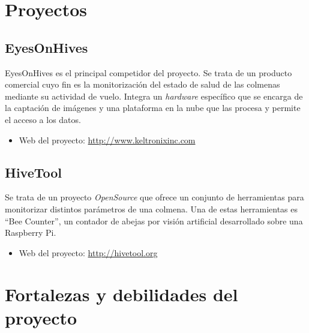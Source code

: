 \section{Proyectos}\label{proyectos}

\subsection{EyesOnHives}\label{eyesonhives}

EyesOnHives es el principal competidor del proyecto. Se trata de un
producto comercial cuyo fin es la monitorización del estado de salud de
las colmenas mediante su actividad de vuelo. Integra un \emph{hardware}
específico que se encarga de la captación de imágenes y una plataforma
en la nube que las procesa y permite el acceso a los datos.

\begin{itemize}
\tightlist
\item
  Web del proyecto: \url{http://www.keltronixinc.com}
\end{itemize}

\subsection{HiveTool}\label{hivetool}

Se trata de un proyecto \emph{OpenSource} que ofrece un conjunto de
herramientas para monitorizar distintos parámetros de una colmena. Una
de estas herramientas es ``Bee Counter'', un contador de abejas por
visión artificial desarrollado sobre una Raspberry Pi.

\begin{itemize}
\tightlist
\item
  Web del proyecto: \url{http://hivetool.org}
\end{itemize}

\section{Fortalezas y debilidades del
proyecto}\label{fortalezas-y-debilidades-del-proyecto}

